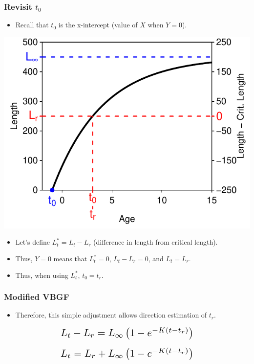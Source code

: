 \documentclass[xcolor=dvipsnames]{beamer}\usepackage[]{graphicx}\usepackage[]{color}
\newenvironment{knitrout}{}{} %
\newcommand*{\Scale}[2][4]{\scalebox{#1}{\ensuremath{#2}}}%
\begin{document}
\begin{frame}[fragile, t]
\frametitle{Revisit $t_{0}$}
  \vspace{-6pt}
  \begin{itemize}
    \item Recall that $t_{0}$ is the x-intercept (value of $X$ when $Y=0$).
  \end{itemize}
\begin{knitrout}\footnotesize
{}\color{fgcolor}

{\centering \includegraphics[width=.5\linewidth]{Figs/redefine5-1} 

}



\end{knitrout}
  \begin{itemize}
    \item Let's define $L^{*}_{t}=L_{t}-L_{r}$ (difference in length from critical length).
    \item Thus, $Y=0$ means that $L^{*}_{t}=0$, $L_{t}-L_{r}=0$, and $L_{t}=L_{r}$.
    \item Thus, when using $L^{*}_{t}$, $t_{0} = t_{r}$.
  \end{itemize}
\end{frame}


\begin{frame}[fragile, t]
\frametitle{Modified VBGF}
\begin{itemize}
  \item Therefore, this simple adjustment allows direction estimation of $t_{r}$.
\end{itemize}

\[\Scale[1.5]{ L_{t}-L_{r} = L_{\infty}\left(1-e^{-K(t-t_{r})}\right) }\]

\[\Scale[1.5]{ L_{t} = L_{r} + L_{\infty}\left(1-e^{-K(t-t_{r})}\right) }\]

\end{frame}
\end{document}
